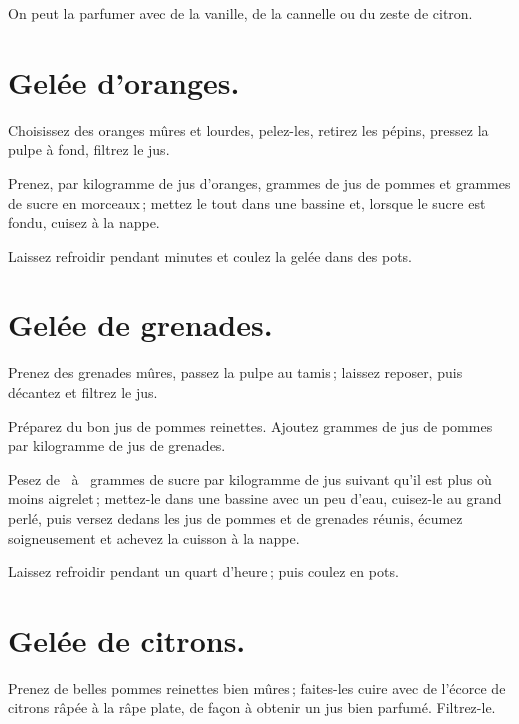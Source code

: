 \medskip

On peut la parfumer avec de la vanille, de la cannelle ou du zeste de citron.

\section*{\centering Gelée d'oranges.}
{}

Choisissez des oranges mûres et lourdes, pelez-les, retirez les pépins, pressez
la pulpe à fond, filtrez le jus.

Prenez, par kilogramme de jus d'oranges, {\mmm} grammes de jus de pommes
et {\mmm} grammes de sucre en morceaux ; mettez le tout dans une bassine
et, lorsque le sucre est fondu, cuisez à la nappe.

Laissez refroidir pendant {\mmm} minutes et coulez la gelée dans des
pots.

\section*{\centering Gelée de grenades.}
{}

Prenez des grenades mûres, passez la pulpe au tamis ; laissez reposer, puis
décantez et filtrez le jus.

Préparez du bon jus de pommes reinettes. Ajoutez {\mmm}  grammes de jus
de pommes par kilogramme de jus de grenades.

Pesez de {\mmm} {\mmm} à {\mmm} {\mmm} grammes de sucre
par kilogramme de jus suivant qu'il est plus où moins aigrelet ; mettez-le dans
une bassine avec un peu d'eau, cuisez-le au grand perlé, puis versez dedans les
jus de pommes et de grenades réunis, écumez soigneusement et achevez la cuisson
à la nappe.

Laissez refroidir pendant un quart d'heure ; puis coulez en pots.

\section*{\centering Gelée de citrons.}
{}

Prenez de belles pommes reinettes bien mûres ; faites-les cuire avec de l'écorce
de citrons râpée à la râpe plate, de façon à obtenir un jus bien parfumé. Filtrez-le.

